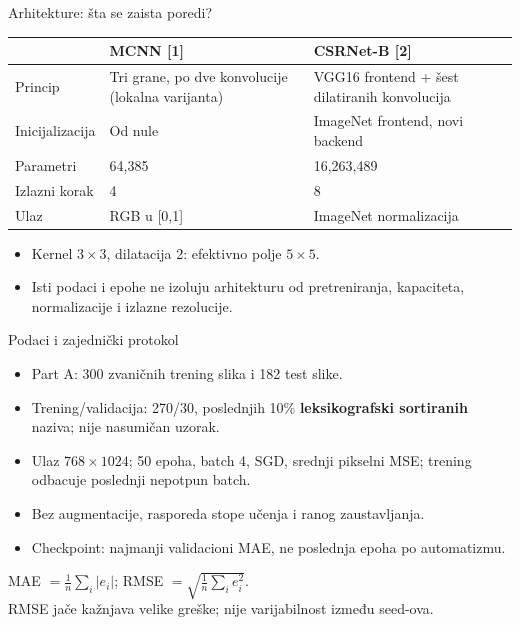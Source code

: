 \documentclass[aspectratio=169]{beamer}
\begin{document}
\begin{frame}{Arhitekture: šta se zaista poredi?}
\small
\begin{tabular}{@{}p{3.1cm}p{4.4cm}p{4.5cm}@{}}
\toprule & MCNN [1] & CSRNet-B [2]\\\midrule
Princip & Tri grane, po dve konvolucije (lokalna varijanta) & VGG16 frontend + šest dilatiranih konvolucija\\
Inicijalizacija & Od nule & ImageNet frontend, novi backend\\
Parametri & 64,385 & 16,263,489\\
Izlazni korak & 4 & 8\\
Ulaz & RGB u [0,1] & ImageNet normalizacija\\\bottomrule
\end{tabular}
\vspace{.5cm}
\begin{itemize}
\item Kernel $3\times3$, dilatacija 2: efektivno polje $5\times5$.
\item Isti podaci i epohe ne izoluju arhitekturu od pretreniranja, kapaciteta, normalizacije i izlazne rezolucije.
\end{itemize}
\end{frame}

\begin{frame}{Podaci i zajednički protokol}
\begin{itemize}
\item Part A: 300 zvaničnih trening slika i 182 test slike.
\item Trening/validacija: 270/30, poslednjih 10\% \textbf{leksikografski sortiranih} naziva; nije nasumičan uzorak.
\item Ulaz $768\times1024$; 50 epoha, batch 4, SGD, srednji pikselni MSE; trening odbacuje poslednji nepotpun batch.
\item Bez augmentacije, rasporeda stope učenja i ranog zaustavljanja.
\item Checkpoint: najmanji validacioni MAE, ne poslednja epoha po automatizmu.
\end{itemize}
\small MAE $=\frac1n\sum_i|e_i|$; RMSE $=\sqrt{\frac1n\sum_i e_i^2}$.\\
RMSE jače kažnjava velike greške; nije varijabilnost između seed-ova.
\end{frame}
\end{document}
